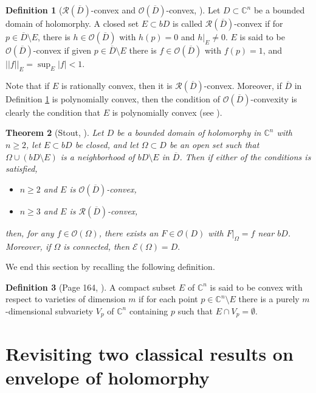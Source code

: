 \documentclass[12pt,reqno, a4paper]{amsart}
\newtheorem{theorem}{Theorem}[section]
\theoremstyle{definition}
\theoremstyle{definition}
\newtheorem{definition}[theorem]{Definition}
\numberwithin{equation}{section}
\def\C{\mathbb{C}}                              %
\begin{document}
\begin{definition}[$\mathcal{R}(\overline{D})$-convex and $\mathcal{O}(\overline{D})$-convex, \cite{st-81}]\label{ODRD-cvx}
Let $D\subset \C^n$ be a bounded domain of holomorphy. A closed set ${E \subset bD}$ is called  $\mathcal{R}(\overline{D})$-convex if for $p\in \overline{D}\setminus E$, there is $h\in \mathcal{O}(\overline{D})$ with $h(p)=0$ and $h|_E \neq 0$. $E$ is said to be  $\mathcal{O}(\overline{D})$-convex if given $p\in \overline{D}\setminus E$ there is $f\in \mathcal{O}(\overline{D})$ with $f(p)=1$, and $||f||_E=\sup_E|f|<1$. 
\end{definition}
Note that if $E$ is rationally convex, then it is $\mathcal{R}(\overline{D})$-convex. Moreover, if $\overline{D}$ in Definition \ref{ODRD-cvx} is polynomially convex, then the condition of $\mathcal{O}(\overline{D})$-convexity is clearly the condition that $E$ is polynomially convex (see \cite{st-81}).
\begin{theorem}[Stout, \cite{st-81}]\label{stout_theo}
	Let $D$ be a bounded domain of holomorphy in $\C^n$ with $n\geq 2$, let $E\subset bD$ be closed, and let $\Omega \subset D$ be an open set such that $\Omega \cup ( bD\setminus E)$ is a
	neighborhood of $ bD\setminus E$ in $\overline{D}$. Then if either of the conditions is satisfied, 
	\begin{itemize}
		\item [(i)] $n\geq 2$ and $E$ is $\mathcal{O}(\overline{D})$-convex,
		\item [(ii)] $n\geq 3$ and $E$ is $\mathcal{R}(\overline{D})$-convex,
	\end{itemize}
	
	then, for any $f\in \mathcal{O}({\Omega})$, there exists an $F\in \mathcal{O}({D})$ with $F|_{\Omega} = f$ near $bD$. Moreover, if $\Omega$ is connected, then $\mathcal{E}(\Omega)=D.$
\end{theorem}
We end this section by recalling the following definition.
\begin{definition}[Page 164, \cite{stout}]\label{var_cvx}
	A compact subset $E$ of $\C^n$ is said to be convex with respect to varieties of dimension $m$ if for each point $p\in \C^n \setminus E$ there is a purely $m$-dimensional subvariety 
	$V_p$ of $\C^n$ containing $p$ such that $E\cap V_p=\emptyset$.
\end{definition}



\section{Revisiting  two classical results on envelope of holomorphy}\label{sec_3}
\end{document}
